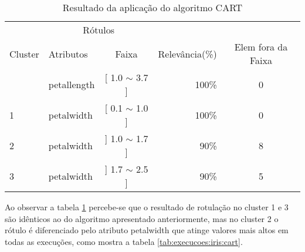 \begin{table}[!h]
\centering
\caption{Resultado da aplicação do algoritmo CART}
\label{tab:rot:iris:cart}
\begin{tabular}{llcrc} \hline \hline
 
\multicolumn{1}{c}{\cellcolor[HTML]{FFFFFF}} & \multicolumn{2}{c}{Rótulos}                & \multicolumn{1}{r}{}               & \\ \cline{2-3}
Cluster                                      & Atributos      & \multicolumn{1}{c}{Faixa} & \multicolumn{1}{c}{Relevância(\%)} & Elem fora da Faixa\\ \hline \hline
                                             & petallength    & [ 1.0 $\sim$  3.7 ]       & 100\%                               & 0 \\  
\multirow{-2}{*}{1}                          & petalwidth     & [ 0.1 $\sim$  1.0 ]       & 100\%                               & 0 \\  \hline
2                                            & petalwidth     & ] 1.0 $\sim$  1.7 ]       & 90\%                               & 8\\  \hline
3                                            & petalwidth     & ] 1.7 $\sim$  2.5 ]       & 90\%                               & 5\\ \hline \hline
\end{tabular}
\end{table}

Ao observar a tabela \ref{tab:rot:iris:cart} percebe-se que o resultado de rotulação no cluster 1 e 3 são idênticos ao do algoritmo apresentado anteriormente, mas  no cluster 2 o rótulo é diferenciado pelo atributo petalwidth que atinge valores mais altos em todas as execuções, como mostra a tabela \ref{tab:execucoes:iris:cart}.



